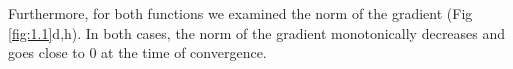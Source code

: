 \documentclass[10pt]{article}
\begin{document}
\medskip
Furthermore, for both functions we examined the norm of the gradient (Fig \ref{fig:1.1}d,h). In both cases, the norm of the gradient monotonically decreases and goes close to 0 at the time of convergence.

\begin{figure}[!h]

\\


\end{figure}
\end{document}
